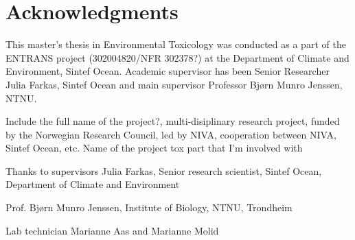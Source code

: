 \chapter*{Acknowledgments}
This master's thesis in Environmental Toxicology was conducted as a part of the ENTRANS project (302004820/NFR 302378?) at the Department of Climate and Environment, Sintef Ocean. Academic supervisor has been Senior Researcher Julia Farkas, Sintef Ocean and main supervisor Professor Bjørn Munro Jenssen, NTNU.

Include the full name of the project?, multi-disiplinary research project, funded by the Norwegian Research Council, led by NIVA, cooperation between NIVA, Sintef Ocean, etc.
Name of the project tox part that I'm involved with

Thanks to supervisors
Julia Farkas, Senior research scientist, Sintef Ocean, Department of Climate and Environment

Prof. Bjørn Munro Jenssen, Institute of Biology, NTNU, Trondheim

Lab technician Marianne Aas and Marianne Molid


